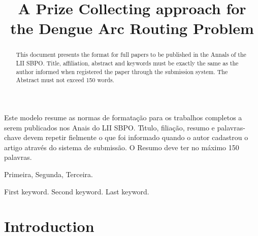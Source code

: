 \documentclass[a4paper,11pt]{article}
\begin{document}
\title{A Prize Collecting approach for the Dengue Arc Routing Problem} 

\maketitle
\thispagestyle{fancy}

\author{
}

\author{ 
}

\vspace{8mm}
\begin{resumo}
Este modelo resume as normas de formata\c c\~ao para os trabalhos completos a serem publicados
nos Anais do LII SBPO. T\'\i tulo, filia\c c\~ao, resumo e palavras-chave devem repetir fielmente
o que foi informado quando o autor cadastrou o artigo atrav\' es do sistema de submiss\~ao.
O Resumo deve ter no m\' aximo 150 palavras.
 \end{resumo}

\bigskip
\begin{palchaves}
Primeira, Segunda, Terceira.

\bigskip
{}
\end{palchaves}


\vspace{8mm}

\begin{abstract}
This document presents the format for full papers to be published in the Annals of the LII SBPO.
Title, affiliation, abstract and keywords must be exactly the same as the author informed when registered the paper through the submission system. 
The Abstract must not exceed 150 words.
\end{abstract}

\bigskip
\begin{keywords}
First keyword. Second keyword. Last keyword.

\bigskip
{}
\end{keywords}

 
\newpage
\section{Introduction}
\end{document}
